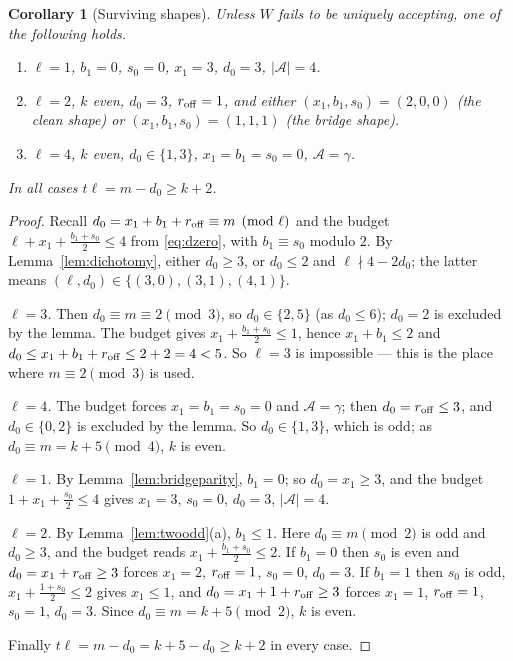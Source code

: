 \documentclass[11pt]{article}
\newtheorem{corollary}[theorem]{Corollary}
\theoremstyle{definition}
\begin{document}
\begin{corollary}[Surviving shapes]\label{cor:shapes}
Unless $W$ fails to be uniquely accepting, one of the following holds.
\begin{enumerate}[leftmargin=2.2em,itemsep=2pt,label=(\alph*)]
\item $\ell=1$, $b_1=0$, $s_0=0$, $x_1=3$, $d_0=3$, $|\mathcal A|=4$.
\item $\ell=2$, $k$ even, $d_0=3$, $r_{\rm off}=1$, and either
$(x_1,b_1,s_0)=(2,0,0)$ (the \emph{clean} shape) or $(x_1,b_1,s_0)=(1,1,1)$
(the \emph{bridge} shape).
\item $\ell=4$, $k$ even, $d_0\in\{1,3\}$, $x_1=b_1=s_0=0$, $\mathcal A=\gamma$.
\end{enumerate}
In all cases $t\ell=m-d_0\ge k+2$.
\end{corollary}

\begin{proof}
Recall $d_0=x_1+b_1+r_{\rm off}\equiv m\pmod\ell$ and the budget
$\ell+x_1+\frac{b_1+s_0}2\le4$ from \eqref{eq:dzero}, with $b_1\equiv s_0$
modulo $2$. By Lemma~\ref{lem:dichotomy}, either $d_0\ge3$, or $d_0\le2$ and
$\ell\nmid4-2d_0$; the latter means $(\ell,d_0)\in\{(3,0),(3,1),(4,1)\}$.

\emph{$\ell=3$.} Then $d_0\equiv m\equiv2\pmod3$, so $d_0\in\{2,5\}$ (as
$d_0\le6$); $d_0=2$ is excluded by the lemma. The budget gives
$x_1+\frac{b_1+s_0}2\le1$, hence $x_1+b_1\le2$ and
$d_0\le x_1+b_1+r_{\rm off}\le2+2=4<5$. So $\ell=3$ is impossible --- this is
the place where $m\equiv2\pmod3$ is used.

\emph{$\ell=4$.} The budget forces $x_1=b_1=s_0=0$ and $\mathcal A=\gamma$;
then $d_0=r_{\rm off}\le3$, and $d_0\in\{0,2\}$ is excluded by the lemma. So
$d_0\in\{1,3\}$, which is odd; as $d_0\equiv m=k+5\pmod 4$, $k$ is even.

\emph{$\ell=1$.} By Lemma~\ref{lem:bridgeparity}, $b_1=0$; so $d_0=x_1\ge3$,
and the budget $1+x_1+\frac{s_0}2\le4$ gives $x_1=3$, $s_0=0$, $d_0=3$,
$|\mathcal A|=4$.

\emph{$\ell=2$.} By Lemma~\ref{lem:twoodd}(a), $b_1\le1$. Here
$d_0\equiv m\pmod2$ is odd and $d_0\ge3$, and the budget reads
$x_1+\frac{b_1+s_0}2\le2$. If $b_1=0$ then $s_0$ is even and
$d_0=x_1+r_{\rm off}\ge3$ forces $x_1=2$, $r_{\rm off}=1$, $s_0=0$, $d_0=3$.
If $b_1=1$ then $s_0$ is odd, $x_1+\frac{1+s_0}2\le2$ gives $x_1\le1$, and
$d_0=x_1+1+r_{\rm off}\ge3$ forces $x_1=1$, $r_{\rm off}=1$, $s_0=1$, $d_0=3$.
Since $d_0\equiv m=k+5\pmod2$, $k$ is even.

Finally $t\ell=m-d_0=k+5-d_0\ge k+2$ in every case.
\end{proof}
\end{document}
